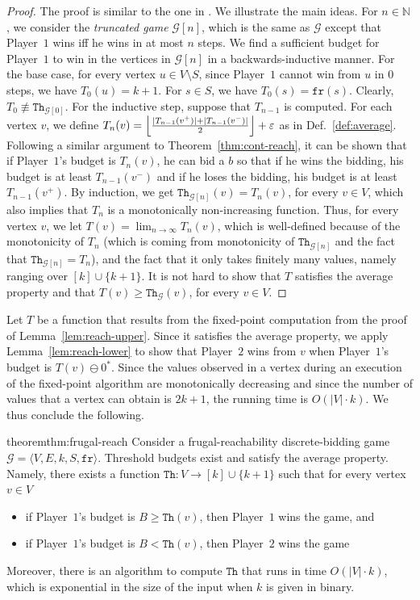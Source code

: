 \documentclass{article}\providecommand{\nequiv}{\not\equiv}\usepackage[a4paper,margin=20mm]{geometry}
\newcommand{\PO}{Player~$1$\xspace}
\newcommand{\PT}{Player~$2$\xspace}
\newcommand{\G}{{\mathcal G}}
\newcommand{\fr}{\texttt{fr}}
\newcommand{\Nat}{\mathbb{N}}
\newcommand{\thresh}{\texttt{Th}\xspace}
\newcommand{\zug}[1]{\langle #1  \rangle}
\newcommand{\predb}[1]{#1 \ominus 0^*\xspace}
\newcommand{\eps}{\varepsilon}
\DeclarePairedDelimiter{\adjustfloor}{\lfloor}{\rfloor}
\newcommand{\floor}[1]{\adjustfloor*{#1}}
\begin{document}
\begin{proof}
	
	The proof is similar to the one in \cite{DP10}. We illustrate the main ideas. For $n \in \Nat$, we consider the {\em truncated game} $\G[n]$, which is the same as $\G$ except that \PO wins iff he wins in at most $n$ steps. We find a sufficient budget for \PO to win in the vertices in $\G[n]$ in a backwards-inductive manner. For the base case, for every vertex $u \in V \setminus S$, since \PO cannot win from $u$ in $0$ steps, we have $T_0(u) = k+1$. For $s \in S$, we have $T_0(s) = \fr(s)$. Clearly, $T_0 \nequiv \thresh_{\G[0]}$. For the inductive step, suppose that $T_{n-1}$ is computed. For each vertex $v$, we define $T_n(v) = \floor{\frac{|T_{n-1}(v^+)| + |T_{n-1}(v^-)|}{2}} +\eps$ as in Def.~\ref{def:average}. Following a similar argument to Theorem~\ref{thm:cont-reach}, it can be shown that if \PO's budget is $T_n(v)$, he can bid a $b$ so that if he wins the bidding, his budget is at least $T_{n-1}(v^-)$ and if he loses the bidding, his budget is at least $T_{n-1}(v^+)$. By induction, we get $\thresh_{\G[n]}(v) = T_{n}(v)$, for every $v \in V$, which also implies that \(T_n\) is a monotonically non-increasing function. Thus, for every vertex $v$, we let $T(v) = \lim_{n \to \infty} T_n(v)$, which is well-defined because of the monotonicity of \(T_n\) (which is coming from monotonicity of \(\thresh_{\G[n]}\) and the fact that \(\thresh_{\G[n]} = T_n\)), and the fact that it only takes finitely many values, namely ranging over \([k] \cup \{k+1\}\).
	It is not hard to show that $T$ satisfies the average property and that $T(v) \geq \thresh_\G(v)$, for every $v \in V$. 
\end{proof}


Let $T$ be a function that results from the fixed-point computation from the proof of Lemma~\ref{lem:reach-upper}. Since it satisfies the average property, we apply Lemma~\ref{lem:reach-lower} to show that \PT wins from $v$ when \PO's budget is $\predb{T(v)}$. 
Since the values observed in a vertex during an execution of the fixed-point algorithm are monotonically decreasing and since the number of values that a vertex can obtain is $2k +1$, the running time is $O(|V| \cdot k)$. 
We thus conclude the following. 



\begin{restatable}{theorem}{thm:frugal-reach}
	\label{thm:frugal-reach}
	Consider a frugal-reachability discrete-bidding game \(\G = \zug{V, E, k, S, \fr}\). Threshold budgets exist and satisfy the average property. Namely, there exists a function \(\thresh: V \rightarrow [k] \cup \{k+1\}\) such that for every vertex $v \in V$ 
	\begin{itemize}
		\item if \PO's budget is $B \geq \thresh(v)$, then \PO wins the game, and
		\item if \PO's budget is $B < \thresh(v)$, then \PT wins the game
	\end{itemize}
	Moreover, there is an algorithm to compute $\thresh$ that runs in time $O(|V| \cdot k)$, which is exponential in the size of the input when $k$ is given in binary.
\end{restatable}
\end{document}
